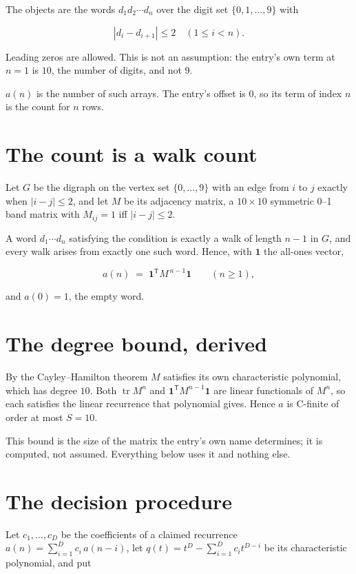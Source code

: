 \documentclass[11pt]{article}
\theoremstyle{definition}
\begin{document}
The objects are the words $d_1 d_2 \cdots d_n$ over the digit set $\{0,1,\dots,9\}$ with

\[|d_i - d_{i+1}| \le 2\quad (1 \le i < n).\]

Leading zeros are allowed. This is not an assumption: the entry's own term at $n=1$ is $10$, the number of digits, and not $9$.

$a(n)$ is the number of such arrays. The entry's offset is 0, so its term of index $n$ is the count for $n$ rows.

\section{The count is a walk count}

Let $G$ be the digraph on the vertex set $\{0,\dots,9\}$ with an edge from $i$ to $j$ exactly when $|i-j| \le 2$, and let $M$ be its adjacency matrix, a $10 \times 10$ symmetric 0--1 band matrix with $M_{ij} = 1$ iff $|i-j| \le 2$.

A word $d_1\cdots d_n$ satisfying the condition is exactly a walk of length $n-1$ in $G$, and every walk arises from exactly one such word. Hence, with $\mathbf 1$ the all-ones vector,

\[a(n) \;=\; \mathbf 1^{\mathsf T} M^{\,n-1} \mathbf 1 \qquad (n \ge 1),\]

and $a(0) = 1$, the empty word.

\section{The degree bound, derived}

By the Cayley--Hamilton theorem $M$ satisfies its own characteristic polynomial, which has degree $10$. Both $\operatorname{tr} M^n$ and $\mathbf 1^{\mathsf T} M^{n-1} \mathbf 1$ are linear functionals of $M^{n}$, so each satisfies the linear recurrence that polynomial gives. Hence $a$ is C-finite of order at most $S = 10$.

This bound is the size of the matrix the entry's own name determines; it is computed, not assumed. Everything below uses it and nothing else.

\section{The decision procedure}

Let $c_1,\dots,c_D$ be the coefficients of a claimed recurrence $a(n) = \sum_{i=1}^{D} c_i\,a(n-i)$, let $q(t) = t^{D} - \sum_{i=1}^{D} c_i t^{D-i}$ be its characteristic polynomial, and put
\end{document}
